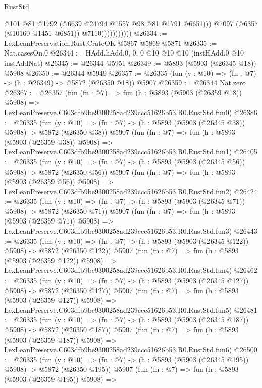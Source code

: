 \begin{lexlean}{RustStd}
\begin{coremodule}
                              @101
                              @81
                              @1792
                              (@6639 @24794 @1557 @98 @81 @1791 @6651)))
                          @7097
                          (@6357 (@10160 @1451 @6851))
                          @7110)))))))))))
@26334 := LexLeanPreservation.Rust.CrateOK @5867 @5869 @5871
@26335 := Nat.casesOn.{0}
@26344 := HAdd.hAdd.{0, 0, 0} @10 @10 @10 (instHAdd.{0} @10 instAddNat)
@26345 := @26344 @5951
@26349 := @5893 (@5903 (@26345 @18)) @5908
@26350 := @26344 @5949
@26357 := @26335 (fun (y : @10) => (fn : @7) -> (h : @26349) -> @5872 (@26350 @18)) @5907
@26359 := @26344 Nat.zero
@26367 := @26357
    (fun (fn : @7) =>
    fun (h : @5893 (@5903 (@26359 @18)) @5908) =>
    LexLeanPreserve.C603dfb9be9300258ad239ccc51626b53.R0.RustStd.fun0)
@26386 := @26335
    (fun (y : @10) => (fn : @7) -> (h : @5893 (@5903 (@26345 @38)) @5908) -> @5872 (@26350 @38))
    @5907
    (fun (fn : @7) =>
    fun (h : @5893 (@5903 (@26359 @38)) @5908) =>
    LexLeanPreserve.C603dfb9be9300258ad239ccc51626b53.R0.RustStd.fun1)
@26405 := @26335
    (fun (y : @10) => (fn : @7) -> (h : @5893 (@5903 (@26345 @56)) @5908) -> @5872 (@26350 @56))
    @5907
    (fun (fn : @7) =>
    fun (h : @5893 (@5903 (@26359 @56)) @5908) =>
    LexLeanPreserve.C603dfb9be9300258ad239ccc51626b53.R0.RustStd.fun2)
@26424 := @26335
    (fun (y : @10) => (fn : @7) -> (h : @5893 (@5903 (@26345 @71)) @5908) -> @5872 (@26350 @71))
    @5907
    (fun (fn : @7) =>
    fun (h : @5893 (@5903 (@26359 @71)) @5908) =>
    LexLeanPreserve.C603dfb9be9300258ad239ccc51626b53.R0.RustStd.fun3)
@26443 := @26335
    (fun (y : @10) => (fn : @7) -> (h : @5893 (@5903 (@26345 @122)) @5908) -> @5872 (@26350 @122))
    @5907
    (fun (fn : @7) =>
    fun (h : @5893 (@5903 (@26359 @122)) @5908) =>
    LexLeanPreserve.C603dfb9be9300258ad239ccc51626b53.R0.RustStd.fun4)
@26462 := @26335
    (fun (y : @10) => (fn : @7) -> (h : @5893 (@5903 (@26345 @127)) @5908) -> @5872 (@26350 @127))
    @5907
    (fun (fn : @7) =>
    fun (h : @5893 (@5903 (@26359 @127)) @5908) =>
    LexLeanPreserve.C603dfb9be9300258ad239ccc51626b53.R0.RustStd.fun5)
@26481 := @26335
    (fun (y : @10) => (fn : @7) -> (h : @5893 (@5903 (@26345 @187)) @5908) -> @5872 (@26350 @187))
    @5907
    (fun (fn : @7) =>
    fun (h : @5893 (@5903 (@26359 @187)) @5908) =>
    LexLeanPreserve.C603dfb9be9300258ad239ccc51626b53.R0.RustStd.fun6)
@26500 := @26335
    (fun (y : @10) => (fn : @7) -> (h : @5893 (@5903 (@26345 @195)) @5908) -> @5872 (@26350 @195))
    @5907
    (fun (fn : @7) =>
    fun (h : @5893 (@5903 (@26359 @195)) @5908) =>

\end{coremodule}
\end{lexlean}
